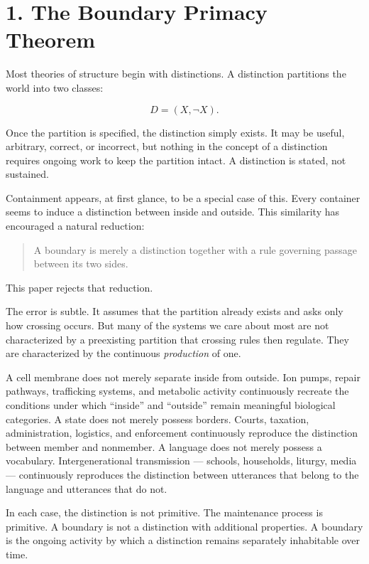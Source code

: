 \documentclass[11pt]{article}
\theoremstyle{plain}
\begin{document}
\newpage

\tableofcontents
\bigskip

\section*{1. The Boundary Primacy Theorem}

Most theories of structure begin with distinctions. A distinction partitions the world into two classes:

\[D = (X, \neg X).\]

Once the partition is specified, the distinction simply exists. It may be useful, arbitrary, correct, or incorrect, but nothing in the concept of a distinction requires ongoing work to keep the partition intact. A distinction is stated, not sustained.

Containment appears, at first glance, to be a special case of this. Every container seems to induce a distinction between inside and outside. This similarity has encouraged a natural reduction:

\begin{quote}
A boundary is merely a distinction together with a rule governing passage between its two sides.
\end{quote}

This paper rejects that reduction.

The error is subtle. It assumes that the partition already exists and asks only how crossing occurs. But many of the systems we care about most are not characterized by a preexisting partition that crossing rules then regulate. They are characterized by the continuous \emph{production} of one.

A cell membrane does not merely separate inside from outside. Ion pumps, repair pathways, trafficking systems, and metabolic activity continuously recreate the conditions under which ``inside'' and ``outside'' remain meaningful biological categories. A state does not merely possess borders. Courts, taxation, administration, logistics, and enforcement continuously reproduce the distinction between member and nonmember. A language does not merely possess a vocabulary. Intergenerational transmission --- schools, households, liturgy, media --- continuously reproduces the distinction between utterances that belong to the language and utterances that do not.

In each case, the distinction is not primitive. The maintenance process is primitive. A boundary is not a distinction with additional properties. A boundary is the ongoing activity by which a distinction remains separately inhabitable over time.
\end{document}
